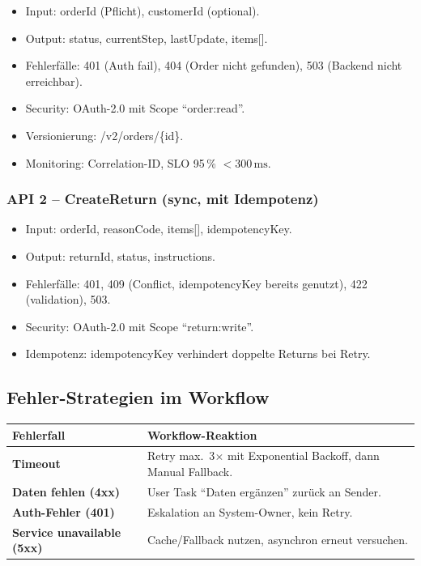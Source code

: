 \documentclass[11pt,a4paper,oneside]{article}
\begin{document}
\begin{itemize}
  \item Input: orderId (Pflicht), customerId (optional).
  \item Output: status, currentStep, lastUpdate, items[].
  \item Fehlerfälle: 401 (Auth fail), 404 (Order nicht gefunden), 503 (Backend nicht erreichbar).
  \item Security: OAuth-2.0 mit Scope ``order:read''.
  \item Versionierung: /v2/orders/\{id\}.
  \item Monitoring: Correlation-ID, SLO 95\,\% $<300\,\text{ms}$.
\end{itemize}

\subsubsection{API 2 -- CreateReturn (sync, mit Idempotenz)}

\begin{itemize}
  \item Input: orderId, reasonCode, items[], idempotencyKey.
  \item Output: returnId, status, instructions.
  \item Fehlerfälle: 401, 409 (Conflict, idempotencyKey bereits genutzt), 422 (validation), 503.
  \item Security: OAuth-2.0 mit Scope ``return:write''.
  \item Idempotenz: idempotencyKey verhindert doppelte Returns bei Retry.
\end{itemize}

\subsection{Fehler-Strategien im Workflow}

\begin{tabularx}{\linewidth}{@{}>{\bfseries}lX@{}}
\toprule
Fehlerfall & Workflow-Reaktion \\
\midrule
Timeout & Retry max.\ 3$\times$ mit Exponential Backoff, dann Manual Fallback. \\
Daten fehlen (4xx) & User Task ``Daten ergänzen'' zurück an Sender. \\
Auth-Fehler (401) & Eskalation an System-Owner, kein Retry. \\
Service unavailable (5xx) & Cache/Fallback nutzen, asynchron erneut versuchen. \\
\bottomrule
\end{tabularx}
\end{document}
